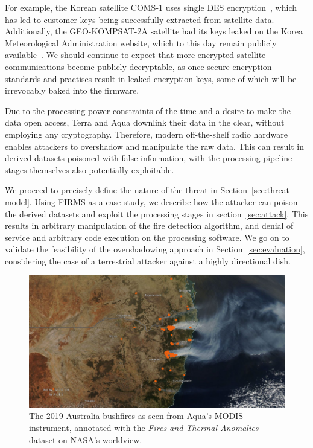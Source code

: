 For example, the Korean satellite COMS-1 uses single DES encryption~\cite{lrit-key-dec}, which has led to customer keys being successfully extracted from satellite data.
Additionally, the GEO-KOMPSAT-2A satellite had its keys leaked on the Korea Meteorological Administration website, which to this day remain publicly available~\cite{xrit-rx}.
We should continue to expect that more encrypted satellite communications become publicly decryptable, as once-secure encryption standards and practises result in leaked encryption keys, some of which will be irrevocably baked into the firmware.

Due to the processing power constraints of the time and a desire to make the data open access, Terra and Aqua downlink their data in the clear, without employing any cryptography.
Therefore, modern off-the-shelf radio hardware enables attackers to overshadow and manipulate the raw data.
This can result in derived datasets poisoned with false information, with the processing pipeline stages themselves also potentially exploitable.

We proceed to precisely define the nature of the threat in Section~\ref{sec:threat-model}.
Using FIRMS as a case study, we describe how the attacker can poison the derived datasets and exploit the processing stages in section~\ref{sec:attack}.
This results in arbitrary manipulation of the fire detection algorithm, and denial of service and arbitrary code execution on the processing software.
We go on to validate the feasibility of the overshadowing approach in Section~\ref{sec:evaluation}, considering the case of a terrestrial attacker against a highly directional dish.

\begin{figure}
    \centering
    \includegraphics[width=\columnwidth]{diagrams/bushfire.png}
    \caption{The 2019 Australia bushfires as seen from Aqua's MODIS instrument, annotated with the \textit{Fires and Thermal Anomalies} dataset on NASA's worldview.\protect\footnotemark}
    \label{fig:bushfire}
\end{figure}

